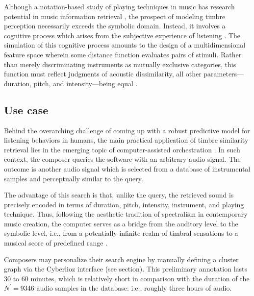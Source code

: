 \documentclass{bmcart}
\makeatletter
\newcommand*{\ie}{i.e.,\@\xspace}
\newcommand{\lnameref}[1]{%
\bgroup
\let\nmu\MakeLowercase
\nameref{#1}\egroup}
\newcommand{\nmu}{}
\makeatother
\begin{document}
Although a notation-based study of playing techniques in music has research potential in music information retrieval \cite{calvo2020acm}, the prospect of modeling timbre perception necessarily exceeds the symbolic domain.
Instead, it involves a cognitive process which arises from the subjective experience of listening \cite{erickson1975book}.
The simulation of this cognitive process amounts to the design of a multidimensional feature space wherein some distance function evaluates pairs of stimuli.
Rather than merely discriminating instruments as mutually exclusive categories, this function must reflect judgments of acoustic dissimilarity, all other parameters---duration, pitch, and intensity---being equal \cite{thoret2018jasa}.

\subsection*{Use case}

Behind the overarching challenge of coming up with a robust predictive model for listening behaviors in humans, the main practical application of timbre similarity retrieval lies in the emerging topic of computer-assisted orchestration \cite{maresz2013cmr}.
In such context, the composer queries the software with an arbitrary audio signal.
The outcome is another audio signal which is selected from a database of instrumental samples and perceptually similar to the query.

The advantage of this search is that, unlike the query, the retrieved sound is precisely encoded in terms of duration, pitch, intensity, instrument, and playing technique.
Thus, following the aesthetic tradition of spectralism in contemporary music creation, the computer serves as a bridge from the auditory level to the symbolic level, \ie{} from a potentially infinite realm of timbral sensations to a musical score of predefined range \cite{caetano2019swarm}.

Composers may personalize their search engine by manually defining a cluster graph via the Cyberlioz interface (see \lnameref{sec:data-collection} section).
This preliminary annotation lasts $30$ to $60$ minutes, which is relatively short in comparison with the duration of the $N^\prime = 9346$ audio samples in the database: i.e., roughly three hours of audio.
\end{document}
